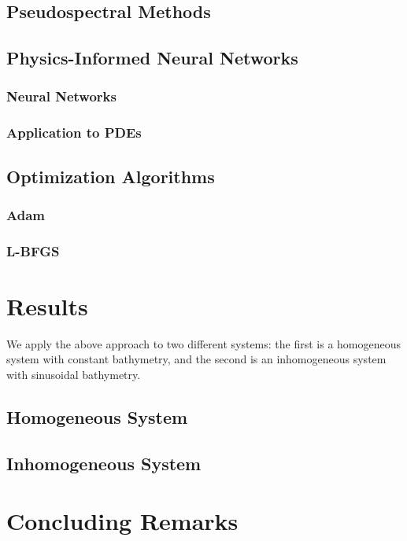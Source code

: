 \documentclass[letterpaper,12pt]{article}
\begin{document}
    \subsection{Pseudospectral Methods}\label{subsec:pseudospectral-methodology}
        

    \subsection{Physics-Informed Neural Networks}\label{subsec:pinn-methodology}
        \subsubsection{Neural Networks}
            
        \subsubsection{Application to PDEs}
            
            
    \subsection{Optimization Algorithms}
        
        \subsubsection{Adam}
            
        \subsubsection{L-BFGS}
            

    \section{Results}\label{sec:results}
    We apply the above approach to two different systems: the first is a homogeneous system with constant bathymetry,
    and the second is an inhomogeneous system with sinusoidal bathymetry. 

    \subsection{Homogeneous System}\label{subsec:homogeneous-results}
        
    
    \subsection{Inhomogeneous System}\label{subsec:inhomogeneous-results}
        

    \section{Concluding Remarks}\label{sec:conclusion}
        

    \pagebreak

    
    

    \pagebreak
    \appendix
\end{document}

